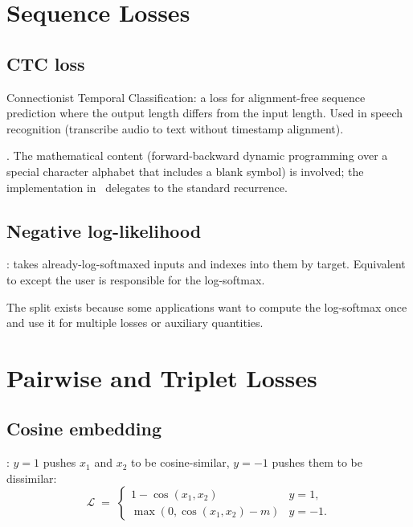 \section{Sequence Losses}
\label{sec:losses:sequence}

\subsection{CTC loss}
\label{ssec:losses:ctc}

Connectionist Temporal Classification: a loss for alignment-free
sequence prediction where the output length differs from the
input length. Used in speech recognition (transcribe audio to
text without timestamp alignment).

.
The mathematical content (forward-backward dynamic programming
over a special character alphabet that includes a blank symbol)
is involved; the implementation in \Lucid\ delegates to the
standard recurrence.

\subsection{Negative log-likelihood}
\label{ssec:losses:nll}

: takes already-log-softmaxed
inputs and indexes into them by target. Equivalent to
 except the user is responsible for the
log-softmax.

The split exists because some applications want to compute the
log-softmax once and use it for multiple losses or auxiliary
quantities.

\section{Pairwise and Triplet Losses}
\label{sec:losses:pairwise}

\subsection{Cosine embedding}
\label{ssec:losses:cosine}

: $y = 1$
pushes $x_1$ and $x_2$ to be cosine-similar, $y = -1$ pushes
them to be dissimilar:
\[
\mathcal{L} \;=\; \begin{cases}
1 - \cos(x_1, x_2) & y = 1, \\
\max(0, \cos(x_1, x_2) - m) & y = -1.
\end{cases}
\]


